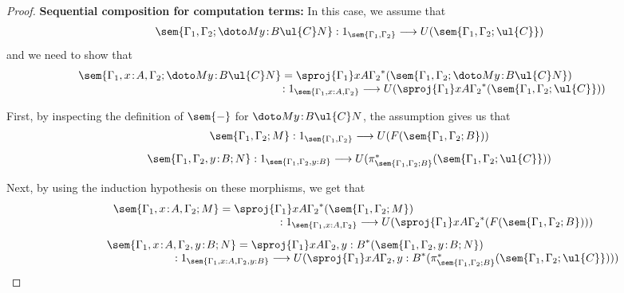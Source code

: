 \begin{proof}
\noindent
\textbf{Sequential composition for computation terms:}
In this case, we assume that 
\[
\sem{\Gamma_1,\Gamma_2; \doto M {y \!:\! B} {\ul{C}} N} : 1_{\sem{\Gamma_1,\Gamma_2}} \longrightarrow U(\sem{\Gamma_1,\Gamma_2;\ul{C}})
\]
and we need to show that
\[
\begin{array}{c}
\hspace{-1.5cm}
\sem{\Gamma_1, x \!:\! A,\Gamma_2;\doto M {y \!:\! B} {\ul{C}} N} = \sproj {\Gamma_1} x A {\Gamma_2}^*(\sem{\Gamma_1,\Gamma_2;\doto M {y \!:\! B} {\ul{C}} N}) 
\\
\hspace{6cm}
: 1_{\sem{\Gamma_1, x : A,\Gamma_2}} \longrightarrow U(\sproj {\Gamma_1} x A {\Gamma_2}^*(\sem{\Gamma_1,\Gamma_2;\ul{C}}))
\end{array}
\]

First, by inspecting the definition of $\sem{-}$ for $\doto M {y \!:\! B} {\ul{C}} N$, the assumption gives us that
\[
\begin{array}{c}
\sem{\Gamma_1,\Gamma_2; M} : 1_{\sem{\Gamma_1,\Gamma_2}} \longrightarrow U(F(\sem{\Gamma_1,\Gamma_2;B}))
\\[3mm]
\sem{\Gamma_1,\Gamma_2, y \!:\! B; N} : 1_{\sem{\Gamma_1,\Gamma_2, y : B}} \longrightarrow U(\pi^*_{\sem{\Gamma_1,\Gamma_2;B}}(\sem{\Gamma_1,\Gamma_2;\ul{C}}))
\end{array}
\]

Next, by using the induction hypothesis on these morphisms, we get that
\[
\begin{array}{c}
\hspace{-5.4cm}
\sem{\Gamma_1, x \!:\! A,\Gamma_2;M} = \sproj {\Gamma_1} x A {\Gamma_2}^*(\sem{\Gamma_1,\Gamma_2;M}) 
\\
\hspace{5.5cm}
: 1_{\sem{\Gamma_1, x : A,\Gamma_2}} \longrightarrow U(\sproj {\Gamma_1} x A {\Gamma_2}^*(F(\sem{\Gamma_1,\Gamma_2;B})))
\\[3mm]
\hspace{-3.4cm}
\sem{\Gamma_1, x \!:\! A,\Gamma_2, y \!:\! B;N} = \sproj {\Gamma_1} x A {\Gamma_2, y : B}^*(\sem{\Gamma_1,\Gamma_2, y \!:\! B;N}) 
\\
\hspace{3cm}
: 1_{\sem{\Gamma_1, x : A,\Gamma_2, y : B}} \longrightarrow U(\sproj {\Gamma_1} x A {\Gamma_2, y : B}^*(\pi^*_{\sem{\Gamma_1,\Gamma_2;B}}(\sem{\Gamma_1,\Gamma_2;\ul{C}})))
\end{array}
\]


\end{proof}
